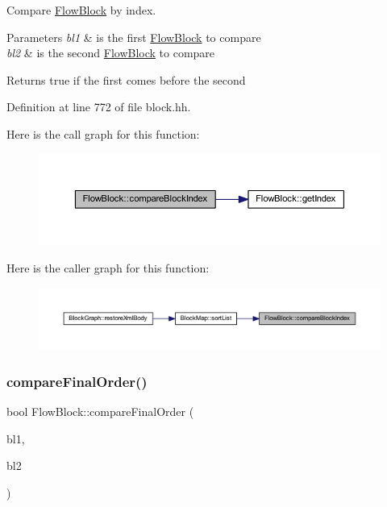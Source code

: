 Compare \mbox{\hyperlink{class_flow_block}{Flow\+Block}} by index. 


\begin{DoxyParams}{Parameters}
{\em bl1} & is the first \mbox{\hyperlink{class_flow_block}{Flow\+Block}} to compare \\
\hline
{\em bl2} & is the second \mbox{\hyperlink{class_flow_block}{Flow\+Block}} to compare \\
\hline
\end{DoxyParams}
\begin{DoxyReturn}{Returns}
true if the first comes before the second 
\end{DoxyReturn}


Definition at line 772 of file block.\+hh.

Here is the call graph for this function\+:
\nopagebreak
\begin{figure}[H]
\begin{center}
\leavevmode
\includegraphics[width=350pt]{class_flow_block_ac83c5d30331ddcae56c23c96088e2ce7_cgraph}
\end{center}
\end{figure}
Here is the caller graph for this function\+:
\nopagebreak
\begin{figure}[H]
\begin{center}
\leavevmode
\includegraphics[width=350pt]{class_flow_block_ac83c5d30331ddcae56c23c96088e2ce7_icgraph}
\end{center}
\end{figure}
\mbox{\label{class_flow_block_a743cb628028fcd227b072bb14587f08e}} 
\subsubsection{\texorpdfstring{compareFinalOrder()}{compareFinalOrder()}}
{\footnotesize\ttfamily bool Flow\+Block\+::compare\+Final\+Order (\begin{DoxyParamCaption}\item[{const \mbox{\hyperlink{class_flow_block}{Flow\+Block}} $\ast$}]{bl1,  }\item[{const \mbox{\hyperlink{class_flow_block}{Flow\+Block}} $\ast$}]{bl2 }\end{DoxyParamCaption})\hspace{0.3cm}{\ttfamily [static]}}



